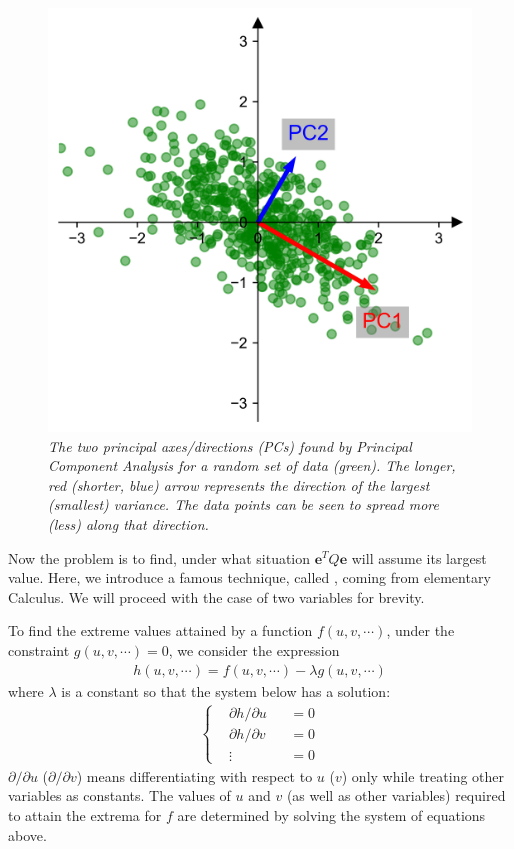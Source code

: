 \begin{figure}[ht!]
    \centering
    \includegraphics{graphics/PCA_first_demo.png}
    \caption{\textit{The two principal axes/directions (PCs) found by Principal Component Analysis for a random set of data (green). The longer, red (shorter, blue) arrow represents the direction of the largest (smallest) variance. The data points can be seen to spread more (less) along that direction.}}
\end{figure}
Now the problem is to find, under what situation $\textbf{e}^T Q \textbf{e}$ will assume its largest value. Here, we introduce a famous technique, called , coming from elementary Calculus. We will proceed with the case of two variables for brevity.
\begin{thm}
\label{thm:LagrangeMul}
To find the extreme values attained by a function $f(u,v,\cdots)$, under the constraint $g(u,v,\cdots) = 0$, we consider the expression
\begin{align}
h(u,v,\cdots) = f(u,v,\cdots) - \lambda g(u,v,\cdots)
\end{align}
where $\lambda$ is a constant so that the system below has a solution:
\begin{align}
\left\{\begin{alignedat}{2}
&\partial h/\partial u & &= 0 \\
&\partial h/\partial v & &= 0 \\
&\vdots & &= 0
\end{alignedat}\right.
\end{align}
$\partial/\partial u$ ($\partial/\partial v$) means differentiating with respect to $u$ ($v$) only while treating other variables as constants. The values of $u$ and $v$ (as well as other variables) required to attain the extrema for $f$ are determined by solving the system of equations above. 
\end{thm}

